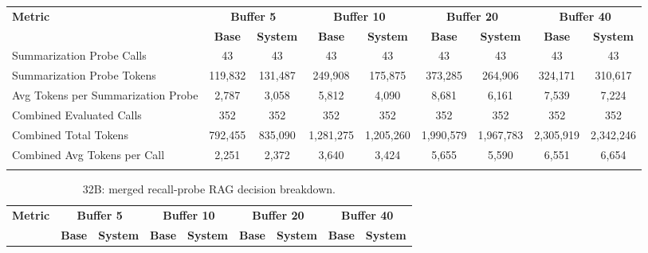 \begin{landscape}
\begin{longtable}{@{}p{3.8cm}cccccccc@{}}
\toprule
\textbf{Metric} & \multicolumn{2}{c}{\textbf{Buffer 5}} & \multicolumn{2}{c}{\textbf{Buffer 10}} & \multicolumn{2}{c}{\textbf{Buffer 20}} & \multicolumn{2}{c}{\textbf{Buffer 40}} \\
\cmidrule(lr){2-3}\cmidrule(lr){4-5}\cmidrule(lr){6-7}\cmidrule(lr){8-9}
 & \textbf{Base} & \textbf{System} & \textbf{Base} & \textbf{System} & \textbf{Base} & \textbf{System} & \textbf{Base} & \textbf{System} \\
\midrule
\endhead
Summarization Probe Calls & 43 & 43 & 43 & 43 & 43 & 43 & 43 & 43 \\
Summarization Probe Tokens & 119,832 & 131,487 & 249,908 & 175,875 & 373,285 & 264,906 & 324,171 & 310,617 \\
Avg Tokens per Summarization Probe & 2,787 & 3,058 & 5,812 & 4,090 & 8,681 & 6,161 & 7,539 & 7,224 \\
Combined Evaluated Calls & 352 & 352 & 352 & 352 & 352 & 352 & 352 & 352 \\
Combined Total Tokens & 792,455 & 835,090 & 1,281,275 & 1,205,260 & 1,990,579 & 1,967,783 & 2,305,919 & 2,342,246 \\
Combined Avg Tokens per Call & 2,251 & 2,372 & 3,640 & 3,424 & 5,655 & 5,590 & 6,551 & 6,654 \\
\botrule
\end{longtable}
\begin{longtable}{@{}p{3.8cm}cccccccc@{}}
\caption{32B: merged recall-probe RAG decision breakdown.}\label{tab:app_32b_rag_probe}\\

\toprule
\textbf{Metric} & \multicolumn{2}{c}{\textbf{Buffer 5}} & \multicolumn{2}{c}{\textbf{Buffer 10}} & \multicolumn{2}{c}{\textbf{Buffer 20}} & \multicolumn{2}{c}{\textbf{Buffer 40}} \\
\cmidrule(lr){2-3}\cmidrule(lr){4-5}\cmidrule(lr){6-7}\cmidrule(lr){8-9}
 & \textbf{Base} & \textbf{System} & \textbf{Base} & \textbf{System} & \textbf{Base} & \textbf{System} & \textbf{Base} & \textbf{System} \\
\midrule
\endfirsthead


\end{longtable}
\end{landscape}
